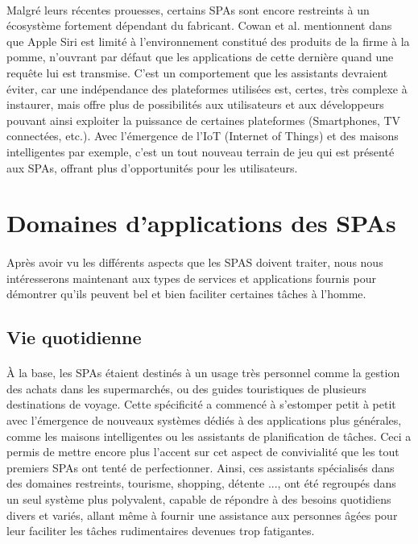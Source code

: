 \paragraph{}
Malgré leurs récentes prouesses, certains SPAs sont encore restreints à un écosystème fortement dépendant du fabricant.  Cowan et al. mentionnent dans \citep{Cowan2017} que Apple Siri est limité à l'environnement constitué des produits de la firme à la pomme, n'ouvrant par défaut que les applications de cette dernière quand une requête lui est transmise. C'est un comportement que les assistants devraient éviter, car une indépendance des plateformes utilisées est, certes, très complexe à instaurer, mais offre plus de possibilités aux utilisateurs et aux développeurs pouvant ainsi exploiter la puissance de certaines plateformes (Smartphones, TV connectées, etc.).
Avec l'émergence de l'IoT (Internet of Things) et des maisons intelligentes  par exemple, c'est un tout nouveau terrain de jeu qui est présenté aux SPAs, offrant plus d'opportunités pour les utilisateurs.
\section{Domaines d'applications des SPAs}
\paragraph{}
Après avoir vu les différents aspects que les SPAS doivent traiter, nous nous intéresserons maintenant aux types de services et applications fournis pour démontrer qu'ils peuvent bel et bien faciliter certaines tâches à l'homme.

\subsection{Vie quotidienne}
\paragraph{}
À la base, les SPAs étaient destinés à un usage très personnel comme la gestion des achats dans les supermarchés, ou des guides touristiques de plusieurs destinations de voyage. Cette spécificité a commencé à s'estomper petit à petit avec l'émergence de nouveaux systèmes dédiés à des applications plus générales, comme les maisons intelligentes ou les assistants de planification de tâches. Ceci a permis de mettre encore plus l'accent sur cet aspect de convivialité que les tout premiers SPAs ont tenté de perfectionner. Ainsi, ces assistants spécialisés dans des domaines restreints, tourisme, shopping, détente ..., ont été regroupés dans un seul système plus polyvalent, capable de répondre à des besoins quotidiens divers et variés, allant même à fournir une assistance aux personnes âgées pour leur faciliter les tâches rudimentaires devenues trop fatigantes. 
